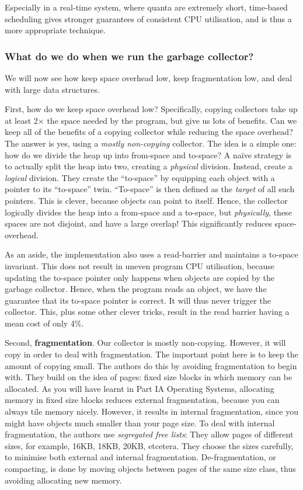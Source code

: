 Especially in a real-time system, where quanta are extremely short, time-based scheduling gives stronger guarantees of consistent CPU utilisation, and is thus a more appropriate technique.

\subsubsection{What do we do when we run the garbage collector?}
We will now see how \citet{bacon-2003} keep space overhead low, keep fragmentation low, and deal with large data structures.

First, how do we keep space overhead low? Specifically, copying collectors take up at least 2$\times$ the space needed by the program, but give us lots of benefits. Can we keep all of the benefits of a copying collector while reducing the space overhead? The answer is yes, using a \textit{mostly non-copying} collector. The idea is a simple one: how do we divide the heap up into from-space and to-space? A naïve strategy is to actually split the heap into two, creating a \textit{physical} division. Instead, \citet{bacon-2003} create a \textit{logical} division. They create the ``to-space'' by equipping each object with a pointer to its ``to-space'' twin. ``To-space'' is then defined as the \textit{target} of all such pointers. This is clever, because objects can point to itself. Hence, the collector logically divides the heap into a from-space and a to-space, but \textit{physically}, these spaces are not disjoint, and have a large overlap! This significantly reduces space-overhead.

As an aside, the implementation also uses a read-barrier and maintains a to-space invariant. This does not result in uneven program CPU utilisation, because updating the to-space pointer only happens when objects are copied by the garbage collector. Hence, when the program reads an object, we have the guarantee that its to-space pointer is correct. It will thus never trigger the collector. This, plus some other clever tricks, result in the read barrier having a mean cost of only 4\%.

Second, \textbf{fragmentation}. Our collector is mostly non-copying. However, it will copy in order to deal with fragmentation. The important point here is to keep the amount of copying small. The authors do this by avoiding fragmentation to begin with. They build on the idea of pages: fixed size blocks in which memory can be allocated. As you will have learnt in \textsf{Part IA Operating Systems}, allocating memory in fixed size blocks reduces external fragmentation, because you can always tile memory nicely. However, it results in internal fragmentation, since you might have objects much smaller than your page size. To deal with internal fragmentation, the authors use \textit{segregated free lists}: They allow pages of different sizes, for example, 16KB, 18KB, 20KB, etcetera. They choose the sizes carefully, to minimise both external and internal fragmentation. De-fragmentation, or compacting, is done by moving objects between pages of the same size class, thus avoiding allocating new memory.

